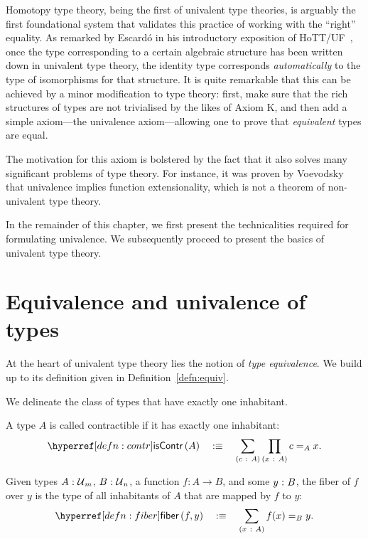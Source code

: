 Homotopy type theory, being the first of univalent type theories, is arguably the first
foundational system that validates this practice of working with the ``right'' equality.
As remarked by Escardó in his introductory exposition of HoTT/UF~\cite{escardo-uf-intro},
once the type corresponding to a certain algebraic structure has been written down in
univalent type theory, the identity type corresponds \emph{automatically} to the type of
isomorphisms for that structure. It is quite remarkable that this can be achieved by a
minor modification to type theory: first, make sure that the rich structures of types are
not trivialised by the likes of Axiom K, and then add a simple axiom---the univalence
axiom---allowing one to prove that \emph{equivalent} types are equal.

The motivation for this axiom is bolstered by the fact that it also solves many
significant problems of type theory. For instance, it was proven by Voevodsky that
univalence implies function extensionality, which is not a theorem of non-univalent type
theory.

In the remainder of this chapter, we first present the technicalities required for
formulating univalence. We subsequently proceed to present the basics of univalent type
theory.

\section{Equivalence and univalence of types}

At the heart of univalent type theory lies the notion of \emph{type equivalence}. We build
up to its definition given in Definition~\ref{defn:equiv}.

We delineate the class of types that have exactly one inhabitant.
\begin{defn}[Contractible]\label{defn:contr}
  A type $A$ is called contractible if it has exactly one inhabitant:
  \begin{equation*}
    \iscontr{A} \quad\is\quad \sigmaty{c}{A}{\pity{x}{A}{c =_A x}}.
  \end{equation*}
\end{defn}

\begin{defn}[Fiber]\label{defn:fiber}
  Given types $A\hspace{0.1mm}:\hspace{0.1mm}\mathcal{U}{}_m$, $B\hspace{0.1mm}:\hspace{0.1mm}\mathcal{U}{}_n$, a function $f : A
  \rightarrow B$, and some $y\hspace{0.1mm}:\hspace{0.1mm}B$, the fiber of $f$ over $y$ is the type of all
  inhabitants of $A$ that are mapped by $f$ to $y$:
  \begin{equation*}
    \fiber{f}{y} \quad\is\quad \sigmaty{x}{A}{f(x) =_B y}.
  \end{equation*}
\end{defn}


